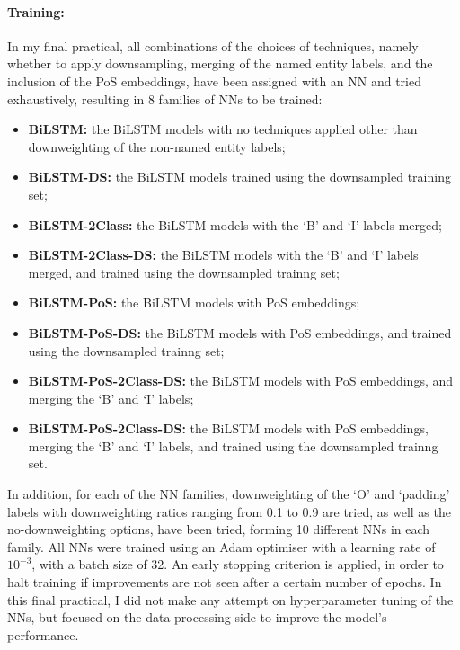 \documentclass[11pt,a4paper]{article}
\begin{document}
\paragraph{Training:}
In my final practical, all combinations of the choices of techniques, namely whether to apply downsampling, merging of the named entity labels, and the inclusion of the PoS embeddings, have been assigned with an NN and tried exhaustively, resulting in 8 families of NNs to be trained:
\begin{itemize}[noitemsep]
    \item \textbf{BiLSTM:} the BiLSTM models with no techniques applied other than downweighting of the non-named entity labels;
    \item \textbf{BiLSTM-DS:} the BiLSTM models trained using the downsampled training set;
    \item \textbf{BiLSTM-2Class:} the BiLSTM models with the `B' and `I' labels merged;
    \item \textbf{BiLSTM-2Class-DS:} the BiLSTM models with the `B' and `I' labels merged, and trained using the downsampled trainng set;
    \item \textbf{BiLSTM-PoS:} the BiLSTM models with PoS embeddings;
    \item \textbf{BiLSTM-PoS-DS:} the BiLSTM models with PoS embeddings, and trained using the downsampled trainng set;
    \item \textbf{BiLSTM-PoS-2Class-DS:} the BiLSTM models with PoS embeddings, and merging the `B' and `I' labels;
    \item \textbf{BiLSTM-PoS-2Class-DS:} the BiLSTM models with PoS embeddings, merging the `B' and `I' labels, and trained using the downsampled trainng set.
\end{itemize}
In addition, for each of the NN families, downweighting of the `O' and `padding' labels with downweighting ratios ranging from 0.1 to 0.9 are tried, as well as the no-downweighting options, have been tried, forming 10 different NNs in each family. All NNs were trained using an Adam optimiser with a learning rate of $10^{-3}$, with a batch size of 32. An early stopping criterion is applied, in order to halt training if improvements are not seen after a certain number of epochs. In this final practical, I did not make any attempt on hyperparameter tuning of the NNs, but focused on the data-processing side to improve the model's performance.
\end{document}
